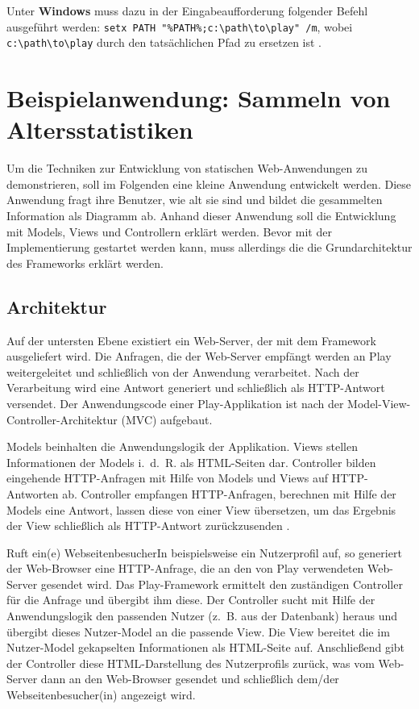 Unter \textbf{Windows} muss dazu in der Eingabeaufforderung folgender Befehl ausgeführt werden: \lstinline|setx PATH "%PATH%;c:\path\to\play" /m|, wobei \lstinline|c:\path\to\play| durch den tatsächlichen Pfad zu ersetzen ist \cite[vgl.][S.~9]{play_for_scala}.





\section{Beispielanwendung: Sammeln von Altersstatistiken} %
\label{sec:beispielanwendung}

Um die Techniken zur Entwicklung von statischen Web-Anwendungen zu demonstrieren, soll im Folgenden eine kleine Anwendung entwickelt werden.
Diese Anwendung fragt ihre Benutzer, wie alt sie sind und bildet die gesammelten Information als Diagramm ab.
Anhand dieser Anwendung soll die Entwicklung mit Models, Views und Controllern erklärt werden.
Bevor mit der Implementierung gestartet werden kann, muss allerdings die die Grundarchitektur des Frameworks erklärt werden.


\subsection{Architektur} %
\label{sub:architektur}

Auf der untersten Ebene existiert ein Web-Server, der mit dem Framework ausgeliefert wird.
Die Anfragen, die der Web-Server empfängt werden an Play weitergeleitet und schließlich von der Anwendung verarbeitet.
Nach der Verarbeitung wird eine Antwort generiert und schließlich als HTTP-Antwort versendet.
Der Anwendungscode einer Play-Applikation ist nach der Model-View-Controller-Architektur (MVC) aufgebaut.

Models beinhalten die Anwendungslogik der Applikation.
Views stellen Informationen der Models i.~d.~R. als HTML-Seiten dar.
Controller bilden eingehende HTTP-Anfragen mit Hilfe von Models und Views auf HTTP-Antworten ab.
Controller empfangen HTTP-Anfragen, berechnen mit Hilfe der Models eine Antwort, lassen diese von einer View übersetzen, um das Ergebnis der View schließlich als HTTP-Antwort zurückzusenden \cite[vgl.][S.~45--48]{play_for_scala}.

Ruft ein(e) WebseitenbesucherIn beispielsweise ein Nutzerprofil auf, so generiert der Web-Browser eine HTTP-Anfrage, die an den von Play verwendeten Web-Server gesendet wird.
Das Play-Framework ermittelt den zuständigen Controller für die Anfrage und übergibt ihm diese.
Der Controller sucht mit Hilfe der Anwendungslogik den passenden Nutzer (z.~B. aus der Datenbank) heraus und übergibt dieses Nutzer-Model an die passende View.
Die View bereitet die im Nutzer-Model gekapselten Informationen als HTML-Seite auf.
Anschließend gibt der Controller diese HTML-Darstellung des Nutzerprofils zurück, was vom Web-Server dann an den Web-Browser gesendet und schließlich dem/der Webseitenbesucher(in) angezeigt wird.

